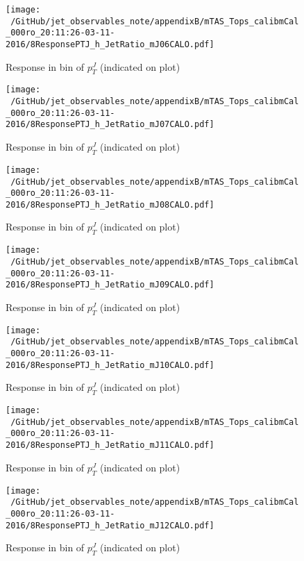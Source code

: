 \begin{figure}

\texttt{[image: ~/GitHub/jet\_observables\_note/appendixB/mTAS\_Tops\_calibmCal\_000ro\_20:11:26-03-11-2016/8ResponsePTJ\_h\_JetRatio\_mJ06CALO.pdf]}
\caption{Response in bin of  $p_{T}^{J}$ (indicated on plot)} 

\end{figure}

%
\begin{figure}

\texttt{[image: ~/GitHub/jet\_observables\_note/appendixB/mTAS\_Tops\_calibmCal\_000ro\_20:11:26-03-11-2016/8ResponsePTJ\_h\_JetRatio\_mJ07CALO.pdf]}
\caption{Response in bin of  $p_{T}^{J}$ (indicated on plot)} 

\end{figure}


\begin{figure}

\texttt{[image: ~/GitHub/jet\_observables\_note/appendixB/mTAS\_Tops\_calibmCal\_000ro\_20:11:26-03-11-2016/8ResponsePTJ\_h\_JetRatio\_mJ08CALO.pdf]}
\caption{Response in bin of  $p_{T}^{J}$ (indicated on plot)} 

\end{figure}

\begin{figure}

\texttt{[image: ~/GitHub/jet\_observables\_note/appendixB/mTAS\_Tops\_calibmCal\_000ro\_20:11:26-03-11-2016/8ResponsePTJ\_h\_JetRatio\_mJ09CALO.pdf]}
\caption{Response in bin of  $p_{T}^{J}$ (indicated on plot)} 

\end{figure}

\begin{figure}

\texttt{[image: ~/GitHub/jet\_observables\_note/appendixB/mTAS\_Tops\_calibmCal\_000ro\_20:11:26-03-11-2016/8ResponsePTJ\_h\_JetRatio\_mJ10CALO.pdf]}
\caption{Response in bin of  $p_{T}^{J}$ (indicated on plot)} 

\end{figure}

\begin{figure}

\texttt{[image: ~/GitHub/jet\_observables\_note/appendixB/mTAS\_Tops\_calibmCal\_000ro\_20:11:26-03-11-2016/8ResponsePTJ\_h\_JetRatio\_mJ11CALO.pdf]}
\caption{Response in bin of  $p_{T}^{J}$ (indicated on plot)} 

\end{figure}

\begin{figure}

\texttt{[image: ~/GitHub/jet\_observables\_note/appendixB/mTAS\_Tops\_calibmCal\_000ro\_20:11:26-03-11-2016/8ResponsePTJ\_h\_JetRatio\_mJ12CALO.pdf]}
\caption{Response in bin of  $p_{T}^{J}$ (indicated on plot)} 

\end{figure}
